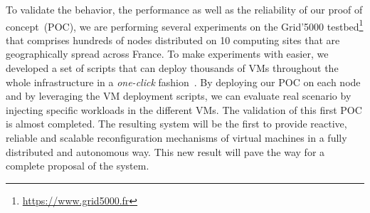 %
To validate the behavior, the performance as well as the reliability of our
proof of concept~(POC), we are performing several experiments on the Grid'5000 testbed\footnote{\url{https://www.grid5000.fr}}
that comprises hundreds of nodes distributed on 10 computing sites that are geographically spread across France. 
To make experiments with \discovery easier, we developed a set of scripts that can deploy thousands of VMs throughout 
the whole infrastructure in a \emph{one-click} fashion~\cite{flauncher}.  
By deploying our POC on each node and by
leveraging the VM deployment scripts, we can evaluate real scenario by injecting specific workloads in the different VMs. 
The validation of this first POC is almost completed. 
The resulting system will be the first to provide reactive,
reliable and scalable
reconfiguration mechanisms of virtual machines in a fully distributed and
autonomous way. This new result will pave the way for a complete proposal of
the \discovery system. 



